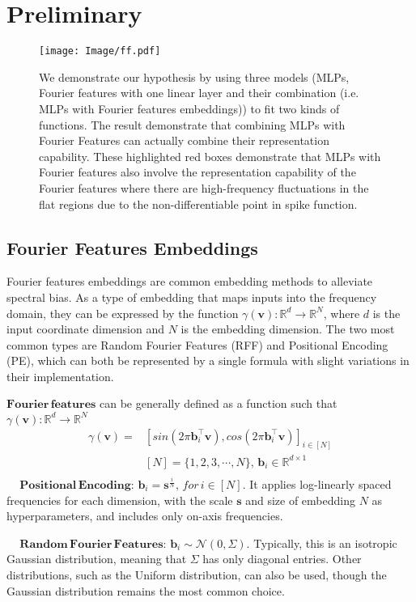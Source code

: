 \section{Preliminary}
\begin{figure*}[!ht]
    \centering
    \texttt{[image: Image/ff.pdf]}
    \caption{We demonstrate our hypothesis by using three models (MLPs, Fourier features with one linear layer and their combination (i.e. MLPs with Fourier features embeddings)) to fit two kinds of functions. The result demonstrate that combining MLPs with Fourier Features can actually combine their representation capability. These highlighted red boxes demonstrate that MLPs with Fourier features also involve the representation capability of the Fourier features where there are high-frequency fluctuations in the flat regions due to the non-differentiable point in spike function.}
    \label{fig:fourier_series} 
\end{figure*}
\subsection{Fourier Features Embeddings}
\label{sec:FF}
Fourier features embeddings are common embedding methods to alleviate spectral bias. As a type of embedding that maps inputs into the frequency domain, they can be expressed by the function $\gamma(\mathbf{v}): \mathbb{R}^d\rightarrow\mathbb{R}^N$, where \(d\) is the input coordinate dimension and \(N\) is the embedding dimension. The two most common types are Random Fourier Features (RFF) and Positional Encoding (PE), which can both be represented by a single formula with slight variations in their implementation.
\begin{definition}
 $\mathbf{Fourier\, features}$ can be generally defined as a function such that $\gamma(\mathbf{v}): \mathbb{R}^d\rightarrow\mathbb{R}^N$
\begin{equation}
\begin{split}
\gamma(\mathbf{v}) = &[sin(2\pi\mathbf{b}_i^{\top}\mathbf{v}), cos(2\pi \mathbf{b}_i^{\top}\mathbf{v})]_{i\in[N]}\\
&[N] = \{1, 2, 3,\cdots, N\},\,\mathbf{b}_i \in\mathbb{R}^{d\times 1}\\
\end{split}
\end{equation}
\,\,\,\,\,\,\,$\mathbf{Positional\, Encoding}$: $\mathbf{b}_i=\mathbf{s}^{\frac{i}{N}}, \, for\, i\in[N]$. It applies log-linearly spaced frequencies for each dimension, with the scale $\mathbf{s}$ and size of embedding \(N\) as hyperparameters, and includes only on-axis frequencies.

\,\,\,\,\,\,\,$\mathbf{Random\, Fourier\, Features}$: $\mathbf{b}_i\sim\mathcal{N}(0, \Sigma)$. Typically, this is an isotropic Gaussian distribution, meaning that $\Sigma$ has only diagonal entries. Other distributions, such as the Uniform distribution, can also be used, though the Gaussian distribution remains the most common choice.
\label{def:ff}
\end{definition}
